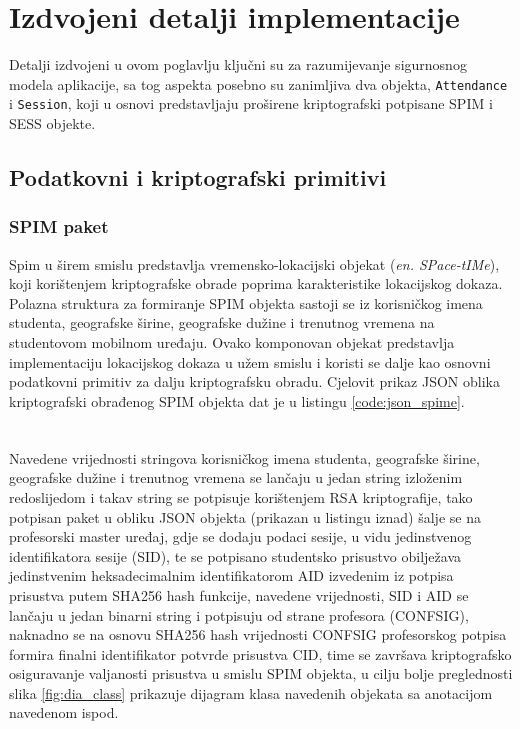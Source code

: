 \chapter{Izdvojeni detalji implementacije} \label{chapter:implementation}
Detalji izdvojeni u ovom poglavlju ključni su za razumijevanje sigurnosnog modela aplikacije, sa tog aspekta posebno su zanimljiva dva objekta, \texttt{Attendance} i \texttt{Session}, koji u osnovi predstavljaju proširene kriptografski potpisane SPIM i SESS objekte.

\section{Podatkovni i kriptografski primitivi}
\subsection{SPIM paket}
Spim u širem smislu predstavlja vremensko-lokacijski objekat (\textit{en. SPace-tIMe}), koji korištenjem kriptografske obrade poprima karakteristike lokacijskog dokaza. Polazna struktura za formiranje SPIM objekta sastoji se iz korisničkog imena studenta, geografske širine, geografske dužine i trenutnog vremena na studentovom mobilnom uređaju. Ovako komponovan objekat predstavlja implementaciju lokacijskog dokaza u užem smislu i koristi se dalje kao osnovni podatkovni primitiv za dalju kriptografsku obradu. Cjelovit prikaz JSON oblika kriptografski obrađenog SPIM objekta dat je u listingu \ref{code:json_spime}.

\begin{code}
    \inputminted{text}{material/logit_tag.txt}
    \label{code:json_spime}
\end{code}

\paragraph*{}
Navedene vrijednosti stringova korisničkog imena studenta, geografske širine, geografske dužine i trenutnog vremena se lančaju u jedan string izloženim redoslijedom i takav string se potpisuje korištenjem RSA kriptografije, tako potpisan paket u obliku JSON objekta (prikazan u listingu iznad) šalje se na profesorski master uređaj, gdje se dodaju podaci sesije, u vidu jedinstvenog identifikatora sesije (SID), te se potpisano studentsko prisustvo obilježava jedinstvenim heksadecimalnim identifikatorom AID izvedenim iz potpisa prisustva putem SHA256 hash funkcije, navedene vrijednosti, SID i AID se lančaju u jedan binarni string i potpisuju od strane profesora (CONFSIG), naknadno se na osnovu SHA256 hash vrijednosti CONFSIG profesorskog potpisa formira finalni identifikator potvrde prisustva CID, time se završava kriptografsko osiguravanje valjanosti prisustva u smislu SPIM objekta, u cilju bolje preglednosti slika \ref{fig:dia_class} prikazuje dijagram klasa navedenih objekata sa anotacijom navedenom ispod.

